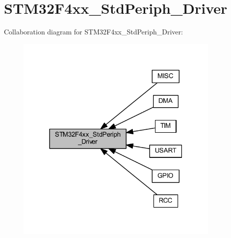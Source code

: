 \hypertarget{group___s_t_m32_f4xx___std_periph___driver}{}\section{S\+T\+M32\+F4xx\+\_\+\+Std\+Periph\+\_\+\+Driver}
\label{group___s_t_m32_f4xx___std_periph___driver}
Collaboration diagram for S\+T\+M32\+F4xx\+\_\+\+Std\+Periph\+\_\+\+Driver\+:
\nopagebreak
\begin{figure}[H]
\begin{center}
\leavevmode
\includegraphics[width=282pt]{group___s_t_m32_f4xx___std_periph___driver}
\end{center}
\end{figure}
